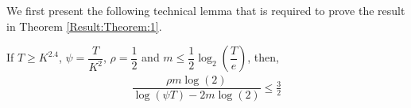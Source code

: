 We first present the following technical lemma that is required  to prove the result in Theorem \ref{Result:Theorem:1}.

\begin{lemma}
\label{proofTheorem:Lemma:1}
If $T\geq K^{2.4}$, $\psi=\dfrac{T}{ K^2}$, $\rho=\dfrac{1}{2}$ and $m\leq \dfrac{1}{2} \log_2\left(\dfrac{T}{e}\right) $, then,
\begin{align*}
\dfrac{\rho m \log(2)}{\log(\psi T) - 2m\log( 2)} \leq \frac{3}{2}
\end{align*}
\end{lemma}
